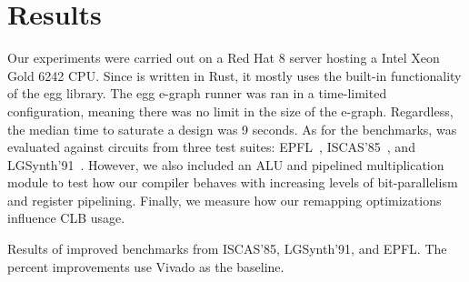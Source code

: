 \section{Results}\label{sec:results}
Our experiments were carried out on a Red Hat 8 server hosting a Intel Xeon
Gold 6242 CPU. Since \shortname{} is written in Rust, it mostly uses the
built-in functionality of the egg library. The egg e-graph runner was ran in a
time-limited configuration, meaning there was no limit in the size of the
e-graph. Regardless, the median time to saturate a design was 9 seconds. As for
the benchmarks, \shortname{} was evaluated against circuits from three test
suites: EPFL~\cite{epflbench}, ISCAS'85~\cite{iscasbench}, and
LGSynth'91~\cite{lgsynthbench}. However, we also included an ALU and pipelined
multiplication module to test how our compiler behaves with increasing levels
of bit-parallelism and register pipelining. Finally, we measure how our
remapping optimizations influence CLB usage.

\begin{table}
    \centering
    \caption{Results of \nimproved{} improved benchmarks from ISCAS'85, LGSynth'91, and EPFL. The percent improvements use Vivado as the baseline.}\label{tab:results}
\end{table}

